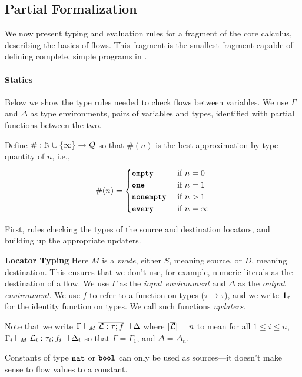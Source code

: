 \documentclass[nonacm, dvipsnames, sigconf]{acmart}
\begin{document}
\subsection{Partial Formalization}

We now present typing and evaluation rules for a fragment of the core calculus, describing the basics of flows.
This fragment is the smallest fragment capable of defining complete, simple programs in \langName.

\paragraph{Statics}
Below we show the type rules needed to check flows between variables.
We use $\Gamma$ and $\Delta$ as type environments, pairs of variables and types, identified with partial functions between the two.

Define $\# : \N \cup \curlys{\infty} \to \mathcal{Q}$ so that $\#(n)$ is the best approximation by type quantity of $n$, i.e.,
\[
    \#(n) =
    \begin{cases}
        \emptyq & \tif n = 0 \\
        \exactlyone & \tif n = 1 \\
        \nonempty & \tif n > 1 \\
        \every & \tif n = \infty \\
    \end{cases}
\]

First, rules checking the types of the source and destination locators, and building up the appropriate updaters.

 \textbf{Locator Typing}
Here $M$ is a \emph{mode}, either $S$, meaning source, or $D$, meaning destination.
This ensures that we don't use, for example, numeric literals as the destination of a flow.
We use $\Gamma$ as the \emph{input environment} and $\Delta$ as the \emph{output environment}.
We use $f$ to refer to a function on types ($\tau \to \tau$), and we write $\id{\tau}$ for the identity function on types.
We call such functions \emph{updaters}.

Note that we write $\Gamma \flowproves_M \overline{\Loc : \tau ; f} \flowprovesout \Delta$ where $|\overline{\Loc}| = n$ to mean
for all $1 \leq i \leq n$, $\Gamma_i \flowproves_M \Loc_i : \tau_i ; f_i \flowprovesout \Delta_i$ so that $\Gamma = \Gamma_1$, and $\Delta = \Delta_n$.

Constants of type $\natt$ or $\boolt$ can only be used as sources---it doesn't make sense to flow values to a constant.
\begin{mathpar}

\end{mathpar}
\end{document}
